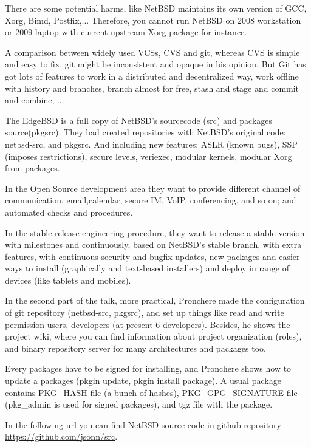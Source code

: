 \documentclass[11pt]{article}
\begin{document}
There are some potential harms, like NetBSD maintains its own version of GCC, Xorg, Bimd, Postfix,... Therefore, you cannot run NetBSD on 2008 workstation or 2009 laptop with current upstream Xorg package for instance.
	
A comparison between widely used VCSs, CVS and git, whereas CVS is simple and easy to fix, git might be inconsistent and opaque in his opinion. But Git has got lots of features to work in a distributed and decentralized way, work offline with history and branches, branch almost for free, stash and stage and commit and combine, ...

The EdgeBSD is a full copy of NetBSD's sourcecode (src) and packages source(pkgsrc). They had created repositories with NetBSD's original code: netbsd-src, and pkgsrc. And including new features: ASLR (known bugs), SSP (imposes restrictions), secure levels, veriexec, modular kernels, modular Xorg from packages.

In the Open Source development area they want to provide different channel of communication, email,calendar, secure IM, VoIP, conferencing, and so on; and automated checks and procedures.

In the stable release engineering procedure, they want to release a stable version with milestones and continuously, based on NetBSD's stable branch, with extra features, with continuous security and bugfix updates, new packages and easier ways to install (graphically and text-based installers) and deploy in range of devices (like tablets and mobiles).

In the second part of the talk, more practical, Pronchere made the configuration of git repository (netbsd-src, pkgsrc), and set up things like read and write permission users, developers (at present 6 developers). Besides, he shows the project wiki, where you can find information about project organization (roles), and binary repository server for many architectures and packages too.

Every packages have to be signed for installing, and Pronchere shows how to update a packages (pkgin update, pkgin install package). A usual package contains PKG\_HASH file (a bunch of hashes), PKG\_GPG\_SIGNATURE file (pkg\_admin is used for signed packages), and tgz file with the package.

In the following url you can find NetBSD source code in github repository \url{https://github.com/jsonn/src}.
\end{document}
